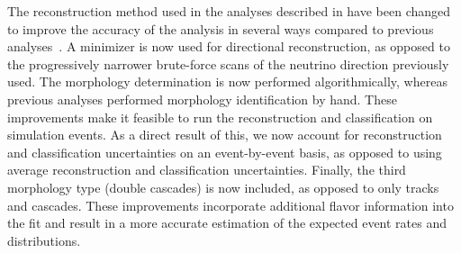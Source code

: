 The reconstruction method used in the analyses described in  have been changed to improve the accuracy of the analysis in several ways compared to previous analyses~\cite{Aartsen:2013jdh,Aartsen:2014gkd,Aartsen:2015zva,Aartsen:2017mau}.
A minimizer is now used for directional reconstruction, as opposed to the progressively narrower brute-force scans of the neutrino direction previously used.
The morphology determination is now performed algorithmically, whereas previous analyses performed morphology identification by hand.
These improvements make it feasible to run the reconstruction and classification on simulation events.
As a direct result of this, we now account for reconstruction and classification uncertainties on an event-by-event basis, as opposed to using average reconstruction and classification uncertainties.
Finally, the third morphology type (double cascades) is now included, as opposed to only tracks and cascades.
These improvements incorporate additional flavor information into the fit and result in a more accurate estimation of the expected event rates and distributions.

